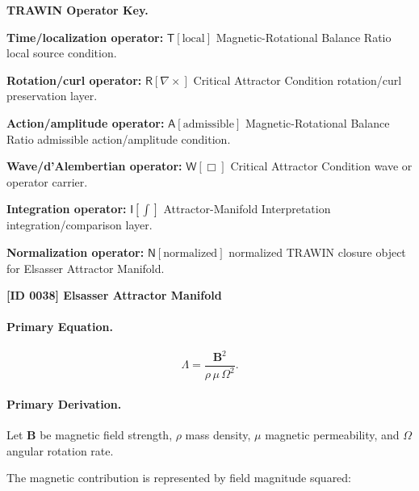 \par\vspace{0.45\baselineskip}
\noindent\begin{minipage}[t]{\linewidth}
\begingroup
\small
\raggedright
\textbf{TRAWIN Operator Key.}\par
\noindent\textbf{Time/localization operator:} $\mathsf{T}\!\left[\mathrm{local}\right]$ Magnetic-Rotational Balance Ratio local source condition.\par
\noindent\textbf{Rotation/curl operator:} $\mathsf{R}\!\left[\nabla\times\right]$ Critical Attractor Condition rotation/curl preservation layer.\par
\noindent\textbf{Action/amplitude operator:} $\mathsf{A}\!\left[\mathrm{admissible}\right]$ Magnetic-Rotational Balance Ratio admissible action/amplitude condition.\par
\noindent\textbf{Wave/d'Alembertian operator:} $\mathsf{W}\!\left[\Box\right]$ Critical Attractor Condition wave or operator carrier.\par
\noindent\textbf{Integration operator:} $\mathsf{I}\!\left[\int\right]$ Attractor-Manifold Interpretation integration/comparison layer.\par
\noindent\textbf{Normalization operator:} $\mathsf{N}\!\left[\mathrm{normalized}\right]$ normalized TRAWIN closure object for Elsasser Attractor Manifold.\par
\endgroup
\end{minipage}

\clearpage
\noindent\textbf{[ID 0038] Elsasser Attractor Manifold}\par
\vspace{0.35em}
\paragraph{Primary Equation.}
\begin{equation}
\Lambda
=
\frac{\mathbf{B}^2}
{\rho\,\mu\,\Omega^2}.
\end{equation}

\paragraph{Primary Derivation.}
Let $\mathbf{B}$ be magnetic field strength, $\rho$ mass density, $\mu$ magnetic permeability, and $\Omega$ angular rotation rate.

The magnetic contribution is represented by field magnitude squared:

